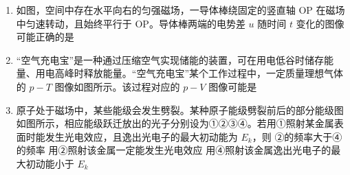 \documentclass[\gkver]{gaokaozhenti}
\begin{document}
\begin{enumerate}
{	CD．乙沿 I 下滑，开始时乙速度为 0，到 N 点时乙竖直方向速度为零，根据瞬时功率公式 $P = mgv_{y}$ 可知重力瞬时功率先增大后减小，CD 错误。

	故选 B。
}

\item
如图，空间中存在水平向右的匀强磁场，一导体棒绕固定的竖直轴 OP 在磁场中匀速转动，且始终平行于 OP。导体棒两端的电势差 $u$ 随时间 $t$ 变化的图像可能正确的是


\onepicture[w=13cm]{}

\item
“空气充电宝”是一种通过压缩空气实现储能的装置，可在用电低谷时储存能量、用电高峰时释放能量。“空气充电宝”某个工作过程中，一定质量理想气体的 $p - T$ 图像如图所示。该过程对应的 $p - V$ 图像可能是


\onepicture[w=13cm]{}

\item
原子处于磁场中，某些能级会发生劈裂。某种原子能级劈裂前后的部分能级图如图所示，相应能级跃迁放出的光子分别设为①②③④。若用①照射某金属表面时能发生光电效应，且逸出光电子的最大初动能为 $E_{k}$，则
{②的频率大于④的频率}
{用②照射该金属一定能发生光电效应}
{用④照射该金属逸出光电子的最大初动能小于 $E_{k}$}
\end{enumerate}
\end{document}
